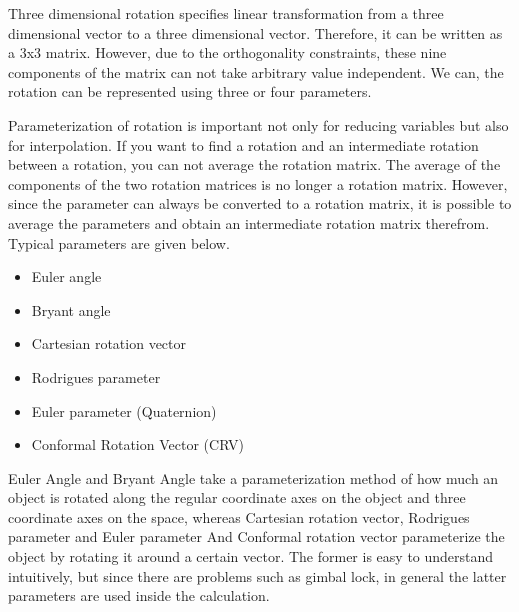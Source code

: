 Three dimensional rotation specifies linear transformation from a three dimensional vector to a three dimensional vector.
%
Therefore, it can be written as a 3x3 matrix.
%
However, due to the orthogonality constraints, these nine components of the matrix can not take arbitrary value independent.
%
We can, the rotation can be represented using three or four parameters.

Parameterization of rotation is important not only for reducing variables but also for interpolation. If you want to find a rotation and an intermediate rotation between a rotation, you can not average the rotation matrix. The average of the components of the two rotation matrices is no longer a rotation matrix. However, since the parameter can always be converted to a rotation matrix, it is possible to average the parameters and obtain an intermediate rotation matrix therefrom. \\

Typical parameters are given below.

\begin{itemize}
\item Euler angle
\item Bryant angle
\item Cartesian rotation vector
\item Rodrigues parameter
\item Euler parameter (Quaternion)
\item Conformal Rotation Vector (CRV)
\end{itemize}

Euler Angle and Bryant Angle take a parameterization method of how much an object is rotated along the regular coordinate axes on the object and three coordinate axes on the space, whereas Cartesian rotation vector, Rodrigues parameter and Euler parameter And Conformal rotation vector parameterize the object by rotating it around a certain vector. The former is easy to understand intuitively, but since there are problems such as gimbal lock, in general the latter parameters are used inside the calculation. \\

